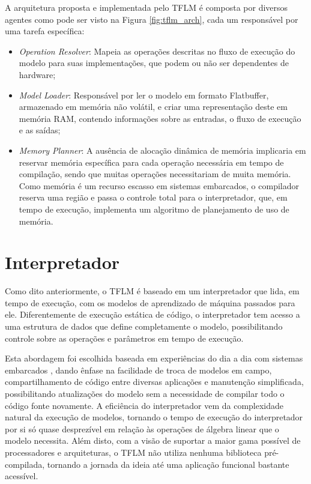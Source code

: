 \documentclass[a5paper]{ufsc-thesis}  %
\begin{document}
A arquitetura proposta e implementada pelo TFLM é composta por diversos agentes como pode ser visto na Figura \ref{fig:tflm_arch}, cada um responsável por uma tarefa específica:
\begin{itemize}
    \item \textit{Operation Resolver}: Mapeia as operações descritas no fluxo de execução do modelo para suas implementações, que podem ou não ser dependentes de hardware;
    
    \item \textit{Model Loader}: Responsável por ler o modelo em formato Flatbuffer, armazenado em memória não volátil, e criar uma representação deste em memória RAM, contendo informações sobre as entradas, o fluxo de execução e as saídas;
    
     \item \textit{Memory Planner}: A ausência de alocação dinâmica de memória implicaria em reservar memória específica para cada operação necessária em tempo de compilação, sendo que muitas operações necessitariam de muita memória. Como memória é um recurso escasso em sistemas embarcados, o compilador reserva uma região e passa o controle total para o interpretador, que, em tempo de execução, implementa um algoritmo de planejamento de uso de memória.
\end{itemize}


\section{Interpretador}
    Como dito anteriormente, o TFLM é baseado em um interpretador que lida, em tempo de execução, com os modelos de aprendizado de máquina passados para ele. Diferentemente de execução estática de código, o interpretador tem acesso a uma estrutura de dados que define completamente o modelo, possibilitando controle sobre as operações e parâmetros em tempo de execução.
    
    Esta abordagem foi escolhida baseada em experiências do dia a dia com sistemas embarcados \cite{tflu}, dando ênfase na facilidade de troca de modelos em campo, compartilhamento de código entre diversas aplicações e manutenção simplificada, possibilitando atualizações do modelo sem a necessidade de compilar todo o código fonte novamente. A eficiência do interpretador vem da complexidade natural da execução de modelos, tornando o tempo de execução do interpretador por si só quase desprezível em relação às operações de álgebra linear que o modelo necessita. Além disto, com a visão de suportar a maior gama possível de processadores e arquiteturas, o TFLM não utiliza nenhuma biblioteca pré-compilada, tornando a jornada da ideia até uma aplicação funcional bastante acessível.
   
\end{document}
